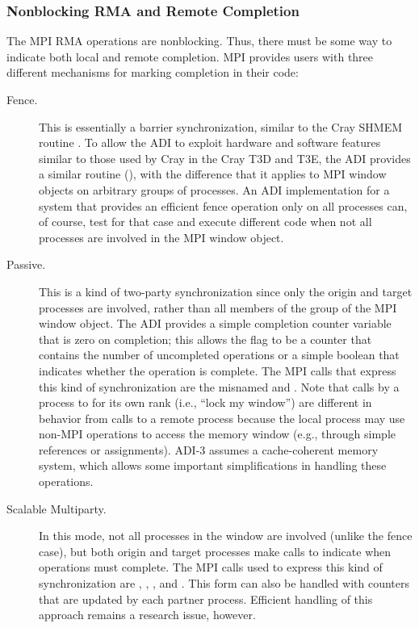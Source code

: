 {\subsubsection{Nonblocking RMA and Remote Completion}
The MPI RMA operations are nonblocking.  Thus, there must be some way
to indicate both local and remote completion.  MPI provides users
with three different mechanisms for marking completion in their code:
\begin{description}
\item[Fence.]This is essentially a barrier synchronization, similar to
the Cray SHMEM routine .  To allow the ADI to exploit
hardware and 
software features similar to those used by Cray  in the
Cray T3D and T3E, the ADI provides a similar routine
(), with the 
difference that it applies to MPI window objects on arbitrary groups
of processes. An ADI implementation for a system that
provides an efficient fence operation only on all processes can, of
course, test for that case and execute different code when not all
processes are involved in the MPI window object.

\item[Passive.]This is a kind of two-party synchronization since only
the origin and target processes are involved, rather than all members of the
group of the MPI window object.  The ADI provides a
simple completion counter variable that is zero on completion; this allows the
flag to be a counter that contains the number of uncompleted
operations or a simple boolean that indicates whether the operation is
complete.  The MPI calls that express this kind of synchronization are the
misnamed 
 and .  Note that calls by a
process to  for its own rank (i.e., ``lock my
window'') are different in behavior from calls to a remote process
because the local process may use non-MPI operations to access the
memory window (e.g., through simple references or assignments).  ADI-3
assumes a cache-coherent memory system, which allows some important
simplifications in handling these operations.

\item[Scalable Multiparty.]In this mode, not all processes in the
window are involved (unlike the fence case), but both origin and
target processes make calls to indicate when operations must complete.
The MPI calls used to express this kind of synchronization are
, , ,
and .
This form can also be handled with counters that are updated by each
partner process.  Efficient handling of this approach remains a
research issue, however.
\end{description}

}
